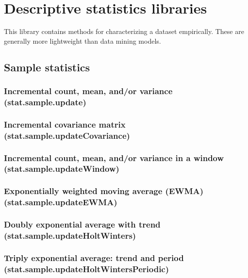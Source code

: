 \documentclass{article}
\theoremstyle{definition}
\begin{document}
\pagebreak

\section{Descriptive statistics libraries}

This library contains methods for characterizing a dataset empirically.  These are generally more lightweight than data mining models.

\subsection{Sample statistics}

\subsubsection{Incremental count, mean, and/or variance (stat.sample.update)}

\subsubsection{Incremental covariance matrix (stat.sample.updateCovariance)}

\subsubsection{Incremental count, mean, and/or variance in a window (stat.sample.updateWindow)}

\subsubsection{Exponentially weighted moving average (EWMA) (stat.sample.updateEWMA)}

\subsubsection{Doubly exponential average with trend (stat.sample.updateHoltWinters)}

\subsubsection{Triply exponential average: trend and period (stat.sample.updateHoltWintersPeriodic)}
\end{document}
